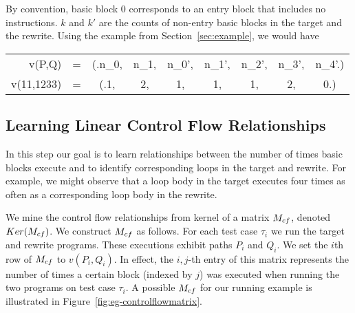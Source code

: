 By convention, basic block 0 corresponds to an entry block that
includes no instructions. $k$ and $k'$ are the counts of non-entry
basic blocks in the target and the rewrite. Using the example from
Section~\ref{sec:example}, we would have\\

\begin{tabular}{RCCCCCCCC}
v(P,Q)     & = & \left(\right.n_0, & n_1, & n_0', & n_1', & n_2', & n_3', & n_4'\left.\right)\\
v(11,1233) & = & \left(\right.1,   & 2,   & 1,    & 1,    & 1,    & 2,    & 0\left.\right)\\
\end{tabular}

\subsection{Learning Linear Control Flow Relationships} \label{algstep1}

In this step our goal is to learn relationships between the number of
times basic blocks execute and to identify corresponding loops in the
target and rewrite. For example, we might observe that a loop body in
the target executes four times as often as a corresponding loop body
in the rewrite.

We mine the control flow relationships from kernel of a matrix
$M_{cf}$, denoted $Ker(M_{cf})$. We
construct $M_{cf}$ as follows. For each test case $\tau_i$
we run the target and rewrite programs. These executions exhibit
paths $P_i$ and $Q_i$. We set the $i$th row of $M_{cf}$
to $v(P_i, Q_i)$. In effect, the $i,j$-th entry of this matrix
represents the number of times a certain block (indexed by $j$) was
executed when running the two programs on test case $\tau_i$. A
possible $M_{cf}$ for our running example is illustrated
in Figure~\ref{fig:eg-controlflowmatrix}.

